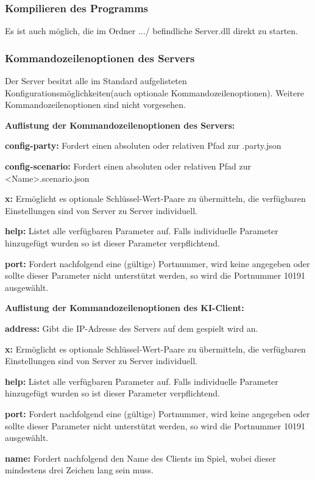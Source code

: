 \documentclass[12pt]{article}
\newcounter{fa}
\begin{document}
\subsubsection{Kompilieren des Programms}
Es ist auch möglich, die im Ordner .../ befindliche  Server.dll direkt zu starten.

\subsubsection{Kommandozeilenoptionen des Servers}
Der Server besitzt alle im Standard aufgelisteten Konfigurationsmöglichkeiten(auch optionale Kommandozeilenoptionen). Weitere Kommandozeilenoptionen sind nicht vorgesehen.

\textbf{Auflistung der Kommandozeilenoptionen des Servers:}

\textbf{config-party:} Fordert einen absoluten oder relativen Pfad zur .party.json

\textbf{config-scenario:} Fordert einen absoluten oder relativen Pfad zur <Name>.scenario.json

\textbf{x:} Ermöglicht es optionale Schlüssel-Wert-Paare zu übermitteln, die verfügbaren Einstellungen sind von
Server zu Server individuell.

\textbf{help:} Listet alle verfügbaren Parameter auf. Falls individuelle Parameter hinzugefügt wurden so ist dieser Parameter verpflichtend.

\textbf{port:} Fordert nachfolgend eine (gültige) Portnummer, wird keine angegeben oder sollte dieser Parameter
nicht unterstützt werden, so wird die Portnummer 10191 ausgewählt.

\textbf{Auflistung der Kommandozeilenoptionen des KI-Client:}

\textbf{address:} Gibt die IP-Adresse des Servers auf dem gespielt wird an.

\textbf{x:} Ermöglicht es optionale Schlüssel-Wert-Paare zu übermitteln, die verfügbaren Einstellungen sind von
Server zu Server individuell.

\textbf{help:} Listet alle verfügbaren Parameter auf. Falls individuelle Parameter hinzugefügt wurden so ist dieser Parameter verpflichtend.

\textbf{port:} Fordert nachfolgend eine (gültige) Portnummer, wird keine angegeben oder sollte dieser Parameter
nicht unterstützt werden, so wird die Portnummer 10191 ausgewählt.

\textbf{name:} Fordert nachfolgend den Name des Clients im Spiel, wobei dieser mindestens drei Zeichen lang
sein muss.
\end{document}

